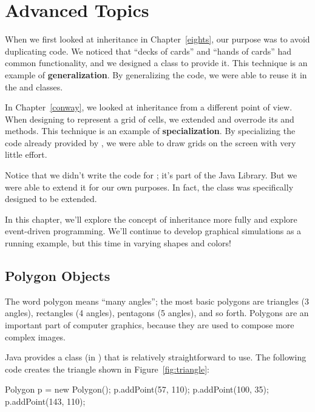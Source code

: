 \chapter{Advanced Topics}


When we first looked at inheritance in Chapter~\ref{eights}, our purpose was to avoid duplicating code.
We noticed that ``decks of cards'' and ``hands of cards'' had common functionality, and we designed a  class to provide it.
This technique is an example of {\bf generalization}.
By generalizing the code, we were able to reuse it in the  and  classes.


In Chapter~\ref{conway}, we looked at inheritance from a different point of view.
When designing  to represent a grid of cells, we extended  and overrode its  and  methods.
This technique is an example of {\bf specialization}.
By specializing the code already provided by , we were able to draw grids on the screen with very little effort.

Notice that we didn't write the code for ; it's part of the Java Library.
But we were able to extend it for our own purposes.
In fact, the  class was specifically designed to be extended.

In this chapter, we'll explore the concept of inheritance more fully and explore event-driven programming.
We'll continue to develop graphical simulations as a running example, but this time in varying shapes and colors!


\section{Polygon Objects}

The word polygon means ``many angles''; the most basic polygons are triangles (3 angles), rectangles (4 angles), pentagons (5 angles), and so forth.
Polygons are an important part of computer graphics, because they are used to compose more complex images.

Java provides a  class (in ) that is relatively straightforward to use.
The following code creates the triangle shown in Figure~\ref{fig:triangle}:

\begin{code}
Polygon p = new Polygon();
p.addPoint(57, 110);
p.addPoint(100, 35);
p.addPoint(143, 110);
\end{code}

